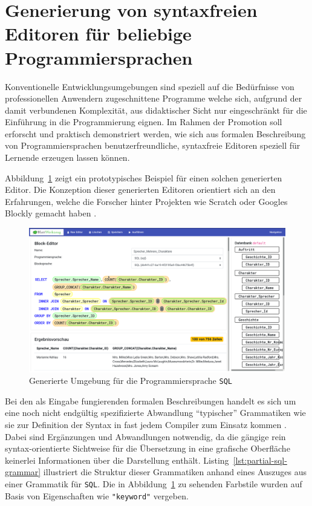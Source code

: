 \documentclass[paper=a4,fontsize=12pt,parskip=half]{scrartcl}
\begin{document}
\section*{Generierung von syntaxfreien Editoren für beliebige Programmiersprachen}

Konventionelle Entwicklungsumgebungen sind speziell auf die Bedürfnisse von professionellen Anwendern zugeschnittene Programme welche sich, aufgrund der damit verbundenen Komplexität, aus didaktischer Sicht nur eingeschränkt für die Einführung in die Programmierung eignen. Im Rahmen der Promotion soll erforscht und praktisch demonstriert werden, wie sich aus formalen Beschreibung von Programmiersprachen benutzerfreundliche, syntaxfreie Editoren speziell für Lernende erzeugen lassen können.

Abbildung~\ref{fig:example-sql-ide} zeigt ein prototypisches Beispiel für einen solchen generierten Editor. Die Konzeption dieser generierten Editoren orientiert sich an den Erfahrungen, welche die Forscher hinter Projekten wie Scratch \cite{resnick_scratch:_2009} oder Googles Blockly gemacht haben \cite{fraser_ten_2015}.

\begin{figure}[p]
  \includegraphics[width=\linewidth]{screenshot-drag-drop-ide.png}
  \caption{Generierte Umgebung für die Programmiersprache \texttt{SQL}}
  \label{fig:example-sql-ide}
\end{figure}



Bei den als Eingabe fungierenden formalen Beschreibungen handelt es sich um eine noch nicht endgültig spezifizierte Abwandlung \enquote{typischer} Grammatiken wie sie zur Definition der Syntax in fast jedem Compiler zum Einsatz kommen \cite[S. 42ff]{aho_compilers:_2007}. Dabei sind Ergänzungen und Abwandlungen notwendig, da die gängige rein syntax-orientierte Sichtweise für die Übersetzung in eine grafische Oberfläche keinerlei Informationen über die Darstellung enthält. Listing~\ref{lst:partial-sql-grammar} illustriert die Struktur dieser Grammatiken anhand eines Auszuges aus einer Grammatik für \texttt{SQL}. Die in Abbildung~\ref{fig:example-sql-ide} zu sehenden Farbstile wurden auf Basis von Eigenschaften wie \texttt{"keyword"} vergeben.
\end{document}

